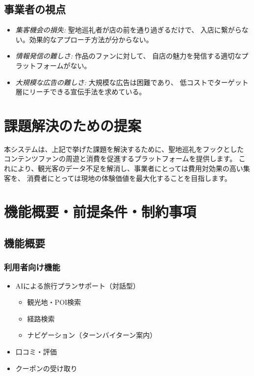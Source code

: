 \documentclass{docs}
\begin{document}
\subsection{事業者の視点}
\begin{itemize}
	\item \emph{集客機会の損失:} 聖地巡礼者が店の前を通り過ぎるだけで、
	入店に繋がらない。効果的なアプローチ方法が分からない。
	\item \emph{情報発信の難しさ:} 作品のファンに対して、
	自店の魅力を発信する適切なプラットフォームがない。
	\item \emph{大規模な広告の難しさ:} 大規模な広告は困難であり、
	低コストでターゲット層にリーチできる宣伝手法を求めている。
\end{itemize}

\section{課題解決のための提案}

本システムは、上記で挙げた課題を解決するために、聖地巡礼をフックとした
コンテンツファンの周遊と消費を促進するプラットフォームを提供します。
これにより、観光客のデータ不足を解消し、事業者にとっては費用対効果の高い集客を、
消費者にとっては現地の体験価値を最大化することを目指します。

\section{機能概要・前提条件・制約事項}

\subsection{機能概要}
\subsubsection{利用者向け機能}
\begin{itemize}
	\item AIによる旅行プランサポート（対話型）
\begin{itemize}
	\item 観光地・POI検索
	\item 経路検索
	\item ナビゲーション（ターンバイターン案内）
\end{itemize}
	\item 口コミ・評価
	\item クーポンの受け取り
\end{itemize}
\end{document}
